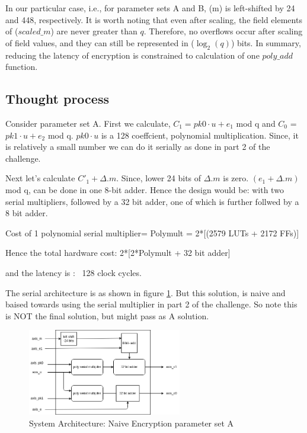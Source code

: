 \documentclass{article}
\begin{document}
In our particular case, i.e., for parameter sets A and B, (m) is left-shifted by 24 and 448, respectively. It is worth noting that even after scaling, the field elements of ($scaled\_m$) are never greater than \(q\). Therefore, no overflows occur after scaling of field values, and they can still be represented in ($\log_2(q)$) bits. In summary, reducing the latency of encryption is constrained to calculation of one $poly\_add$ function.

\subsection{Thought process}

Consider parameter set A. First we calculate, $C_1 = pk0 \cdot u + e_1$  mod q and $C_0$ = $pk1 \cdot u + e_2$ mod q. 
 $ pk0 \cdot u$ is a 128 coeffcient, polynomial multiplication. Since, it is relatively a
small number we can do it serially as done in part 2 of the challenge. 
     
Next let's calculate $C'_1 + \Delta.m$. Since, lower 24 bits of $\Delta.m$ is zero. $(e_1 + \Delta.m)$ mod q, can be done in one 8-bit adder.    
    Hence the design would be: with two serial multipliers, followed by a 32 bit adder, one of which
    is further follwed by a 8 bit adder.

    Cost of 1 polynomial serial multiplier= Polymult = 2*[(2579 LUTs + 2172 FFs)] 

    Hence the total hardware cost: 2*[2*Polymult + 32 bit adder]

    and the latency is : ~128 clock cycles.

    The serial architecture is as shown in figure \ref{fig:param_enc}. But this solution, is naive and baised towards using 
the serial multiplier in part 2 of the challenge. So note this is NOT the final solution, but might pass as A solution. 

    \begin{figure}[htp] 
      \centering
      \includegraphics[width=0.6\textwidth]{enc_param_a.png}
      \caption{System Architecture: Naive Encryption parameter set A}
      \label{fig:param_enc} 
    \end{figure}
\end{document}
